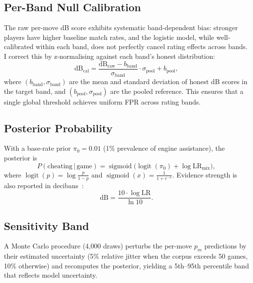 \documentclass[11pt,a4paper]{article}
\DeclareMathOperator{\logit}{logit}
\DeclareMathOperator{\sigmoid}{sigmoid}
\newcommand{\given}{\,|\,}
\theoremstyle{definition}
\begin{document}
\subsection{Per-Band Null Calibration}
\label{sec:permove-cal}

The raw per-move dB score exhibits systematic band-dependent bias:
stronger players have higher baseline match rates, and the logistic
model, while well-calibrated within each band, does not perfectly
cancel rating effects across bands.  I correct this by z-normalising
against each band's honest distribution:
\begin{equation}
  \label{eq:band-cal}
  \mathrm{dB}_{\mathrm{cal}}
  = \frac{\mathrm{dB}_{\mathrm{raw}} - b_{\mathrm{band}}}
         {\sigma_{\mathrm{band}}}
    \cdot \sigma_{\mathrm{pool}} + b_{\mathrm{pool}},
\end{equation}
where $(b_{\mathrm{band}}, \sigma_{\mathrm{band}})$ are the mean and
standard deviation of honest dB scores in the target band, and
$(b_{\mathrm{pool}}, \sigma_{\mathrm{pool}})$ are the pooled
reference.  This ensures that a single global threshold achieves
uniform FPR across rating bands.

\subsection{Posterior Probability}
\label{sec:posterior}

With a base-rate prior $\pi_0 = 0.01$ (1\% prevalence of engine
assistance), the posterior is
\begin{equation}
  \label{eq:posterior}
  P(\text{cheating} \given \text{game})
  = \sigmoid\!\bigl(\logit(\pi_0) + \log \mathrm{LR}_{\mathrm{mix}}\bigr),
\end{equation}
where $\logit(p) = \log\frac{p}{1-p}$ and
$\sigmoid(x) = \frac{1}{1 + e^{-x}}$.  Evidence strength is also
reported in decibans~\citep{good1979studies}:
\begin{equation}
  \label{eq:decibans}
  \mathrm{dB} = \frac{10 \cdot \log \mathrm{LR}}{\ln 10}.
\end{equation}

\subsection{Sensitivity Band}

A Monte Carlo procedure (4{,}000 draws) perturbs the per-move $p_m$
predictions by their estimated uncertainty (5\% relative jitter when the
corpus exceeds 50 games, 10\% otherwise) and recomputes the posterior,
yielding a 5th--95th percentile band that reflects model uncertainty.
\end{document}
